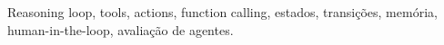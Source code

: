 
Reasoning loop, tools, actions, function calling, estados, transições, memória, human-in-the-loop, avaliação de agentes.

